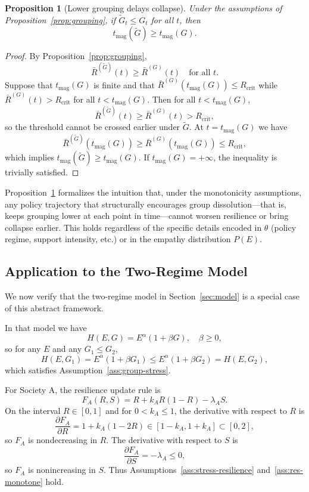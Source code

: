 \documentclass[11pt]{article}
\theoremstyle{plain}
\newtheorem{proposition}{Proposition}
\begin{document}
\begin{proposition}[Lower grouping delays collapse]
\label{prop:maginot}
Under the assumptions of Proposition~\ref{prop:grouping}, if $\tilde{G}_t \le G_t$ for all $t$, then
\[
t_{\text{mag}}(\tilde{G}) \ge t_{\text{mag}}(G).
\]
\end{proposition}

\begin{proof}
By Proposition~\ref{prop:grouping},
\[
\bar{R}^{(\tilde{G})}(t) \ge \bar{R}^{(G)}(t) \quad \text{for all } t.
\]
Suppose that $t_{\text{mag}}(G)$ is finite and that $\bar{R}^{(G)}(t_{\text{mag}}(G)) \le R_{\text{crit}}$ while $\bar{R}^{(G)}(t) > R_{\text{crit}}$ for all $t < t_{\text{mag}}(G)$.
Then for all $t < t_{\text{mag}}(G)$,
\[
\bar{R}^{(\tilde{G})}(t) \ge \bar{R}^{(G)}(t) > R_{\text{crit}},
\]
so the threshold cannot be crossed earlier under $\tilde{G}$.
At $t = t_{\text{mag}}(G)$ we have
\[
\bar{R}^{(\tilde{G})}(t_{\text{mag}}(G)) \ge \bar{R}^{(G)}(t_{\text{mag}}(G)) \le R_{\text{crit}},
\]
which implies $t_{\text{mag}}(\tilde{G}) \ge t_{\text{mag}}(G)$.
If $t_{\text{mag}}(G) = +\infty$, the inequality is trivially satisfied.
\end{proof}

Proposition~\ref{prop:maginot} formalizes the intuition that, under the monotonicity assumptions, any policy trajectory that structurally encourages group dissolution---that is, keeps grouping lower at each point in time---cannot worsen resilience or bring collapse earlier.
This holds regardless of the specific details encoded in $\theta$ (policy regime, support intensity, etc.) or in the empathy distribution $P(E)$.

\subsection{Application to the Two-Regime Model}

We now verify that the two-regime model in Section~\ref{sec:model} is a special case of this abstract framework.

In that model we have
\[
H(E,G) = E^{\alpha} (1 + \beta G), \quad \beta \ge 0,
\]
so for any $E$ and any $G_1 \le G_2$,
\[
H(E,G_1) = E^{\alpha} (1 + \beta G_1)
\le E^{\alpha} (1 + \beta G_2) = H(E,G_2),
\]
which satisfies Assumption~\ref{ass:group-stress}.

For Society A, the resilience update rule is
\[
F_A(R,S) = R + k_A R(1-R) - \lambda_A S.
\]
On the interval $R \in [0,1]$ and for $0 < k_A \le 1$, the derivative with respect to $R$ is
\[
\frac{\partial F_A}{\partial R}
= 1 + k_A (1 - 2R)
\in [1 - k_A, 1 + k_A] \subset [0,2],
\]
so $F_A$ is nondecreasing in $R$.
The derivative with respect to $S$ is
\[
\frac{\partial F_A}{\partial S} = -\lambda_A \le 0,
\]
so $F_A$ is nonincreasing in $S$.
Thus Assumptions~\ref{ass:stress-resilience} and~\ref{ass:res-monotone} hold.
\end{document}
